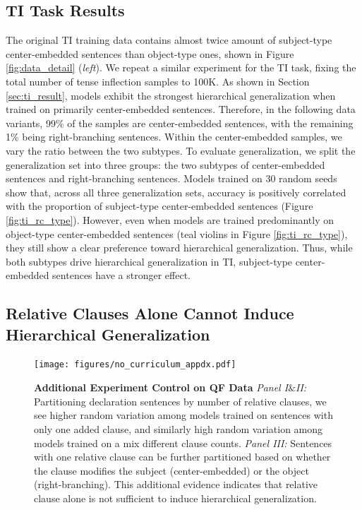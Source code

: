 \subsection{TI Task Results} 
The original TI training data contains almost twice amount of subject-type center-embedded sentences than object-type ones, shown in Figure \ref{fig:data_detail} (\textit{left}).
We repeat a similar experiment for the TI task, fixing the total number of tense inflection samples to 100K. As shown in Section \ref{sec:ti_result}, models exhibit the strongest hierarchical generalization when trained on primarily center-embedded sentences. Therefore, in the following data variants, 99\% of the samples are center-embedded sentences, with the remaining 1\% being right-branching sentences. Within the center-embedded samples, we vary the ratio between the two subtypes. To evaluate generalization, we split the generalization set into three groups: the two subtypes of center-embedded sentences and right-branching sentences. Models trained on 30 random seeds show that, across all three generalization sets, accuracy is positively correlated with the proportion of subject-type center-embedded sentences (Figure \ref{fig:ti_rc_type}). However, even when models are trained predominantly on object-type center-embedded sentences (teal violins in Figure \ref{fig:ti_rc_type}), they still show a clear preference toward hierarchical generalization. Thus, while both subtypes drive hierarchical generalization in TI, subject-type center-embedded sentences have a stronger effect. 




\iffalse
\subsection{Relative Clauses Alone Cannot Induce Hierarchical Generalization}
\label{appdx:additionl_control}

\begin{figure}[t!]
    \centering
    \texttt{[image: figures/no\_curriculum\_appdx.pdf]}
    \caption{\textbf{Additional Experiment Control on QF Data} 
    \textit{Panel I$\&$II:} Partitioning declaration sentences by number of relative clauses, we see higher random variation among models trained on sentences with only one added clause, and similarly high random variation among models trained on a mix different clause counts.
    \textit{Panel III:} Sentences with one relative clause can be further partitioned based on whether the clause modifies the subject (center-embedded) or the object (right-branching). This additional evidence indicates that relative clause alone is not sufficient to induce hierarchical generalization.
    }
    \label{fig:grokking_selection_appdx}
\end{figure}


